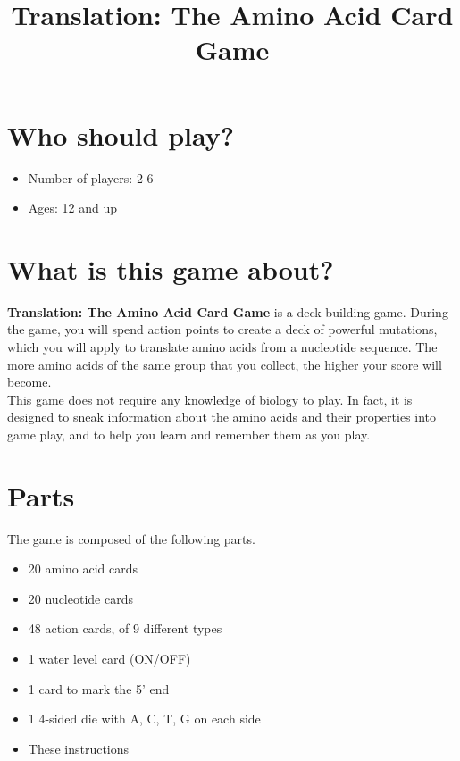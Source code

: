 \documentclass[a4paper,11pt,oneside]{memoir}
\title{Translation: The Amino Acid Card Game}
\author{}
\date{}
\begin{document}
\maketitle


\section*{Who should play?}

\begin{itemize}
    \item Number of players: 2-6
    \item Ages: 12 and up
\end{itemize}


\section*{What is this game about?}

\textbf{Translation: The Amino Acid Card Game} is a deck building game.
During the game, you will spend action points to create a deck of powerful mutations, which you will apply to translate amino acids from a nucleotide sequence.
The more amino acids of the same group that you collect, the higher your score will become. \\

This game does not require any knowledge of biology to play.
In fact, it is designed to sneak information about the amino acids and their properties into game play, and to help you learn and remember them as you play.


\section*{Parts}

The game is composed of the following parts.
\begin{itemize}
    \item 20 amino acid cards
    \item 20 nucleotide cards
    \item 48 action cards, of 9 different types
    \item 1 water level card (ON/OFF)
    \item 1 card to mark the 5' end
    \item 1 4-sided die with A, C, T, G on each side
    \item These instructions
\end{itemize}
\end{document}
